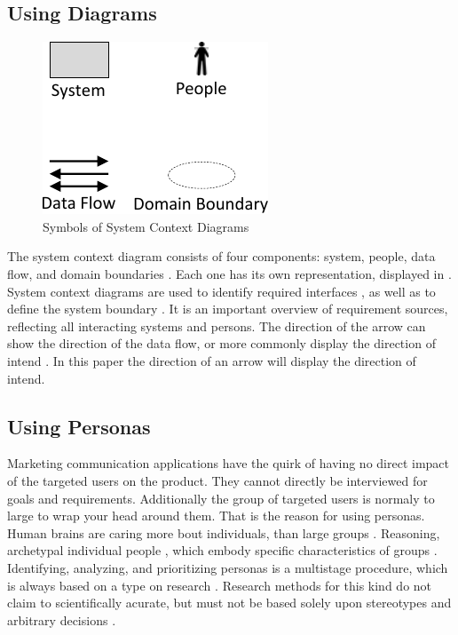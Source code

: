 \subsection{Using Diagrams}
\begin{figure}
    \centering
    \includegraphics[scale=1]{img/SCDSymbols.pdf}
    \caption[Symbols of System Context Diagrams]{Symbols of System Context Diagrams \parencites[77]{Lauesen.2008}}
    \label{fig:scdSym}
\end{figure}
The system context diagram consists of four components: system, people, data flow, and domain boundaries \parencites[cf.][76-77]{Lauesen.2008}. Each one has its own representation, displayed in . System context diagrams are used to identify required interfaces \parencites[cf.][75]{Lauesen.2008}, as well as to define the system boundary \parencites[cf.][75]{Ebert.2014}. It is an important overview of requirement sources, reflecting all interacting systems and persons. The direction of the arrow can show the direction of the data flow, or more commonly display the direction of intend \parencite[cf.][77]{Lauesen.2008}. In this paper the direction of an arrow will display the direction of intend.
\subsection{Using Personas}
Marketing communication applications have the quirk of having no direct impact of the targeted users on the product. They cannot directly be interviewed for goals and requirements. Additionally the group of targeted users is normaly to large to wrap your head around them. That is the reason for using personas. Human brains are caring more bout individuals, than large groups \parencite[cf.][]{Platt.2016}. Reasoning, archetypal individual people \parencite[cf.][81-82]{Cooper.2007}, which embody specific characteristics of groups \parencite[cf.][]{Platt.2016}. Identifying, analyzing, and prioritizing personas is a multistage procedure, which is always based on a type on research \parencite[cf.][39]{Robier.2016}. Research methods for this kind do not claim to scientifically acurate, but must not be based solely upon stereotypes and arbitrary decisions \parencite[cf.][82-83]{Cooper.2007}. 
